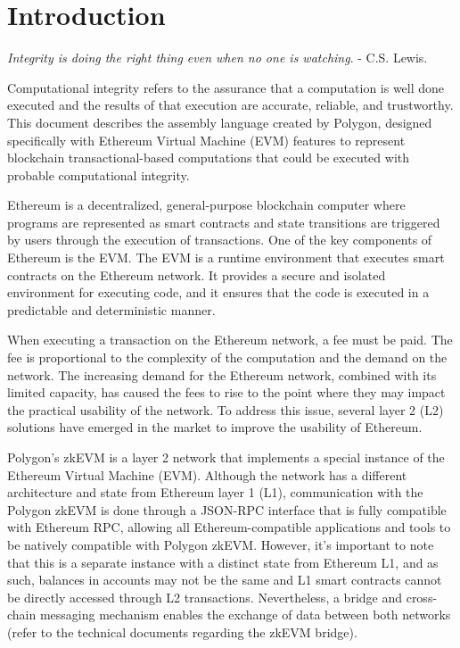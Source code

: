 \section{Introduction}

\textit{Integrity is doing the right thing even when no one is watching}. - C.S. Lewis. 

Computational integrity refers to the assurance that a computation is well done executed and the results of that execution are accurate, reliable, and trustworthy. This document describes the assembly language created by Polygon, designed specifically with Ethereum Virtual Machine (EVM) features to represent blockchain transactional-based computations that could be executed with probable computational integrity.

Ethereum is a decentralized, general-purpose blockchain computer where programs are represented as smart contracts and state transitions are triggered by users through the execution of transactions. One of the key components of Ethereum is the EVM. The EVM is a runtime environment that executes smart contracts on the Ethereum network. It provides a secure and isolated environment for executing code, and it ensures that the code is executed in a predictable and deterministic manner. 

When executing a transaction on the Ethereum network, a fee must be paid. The fee is proportional to the complexity of the computation and the demand on the network. The increasing demand for the Ethereum network, combined with its limited capacity, has caused the fees to rise to the point where they may impact the practical usability of the network. To address this issue, several layer 2 (L2) solutions have emerged in the market to improve the usability of Ethereum.

Polygon's zkEVM is a layer 2 network that implements a special instance of the Ethereum Virtual Machine (EVM). Although the network has a different architecture and state from Ethereum layer 1 (L1), communication with the Polygon zkEVM is done through a JSON-RPC interface that is fully compatible with Ethereum RPC, allowing all Ethereum-compatible applications and tools to be natively compatible with Polygon zkEVM. However, it's important to note that this is a separate instance with a distinct state from Ethereum L1, and as such, balances in accounts may not be the same and L1 smart contracts cannot be directly accessed through L2 transactions. Nevertheless, a bridge and cross-chain messaging mechanism enables the exchange of data between both networks (refer to the technical documents regarding the zkEVM bridge).



